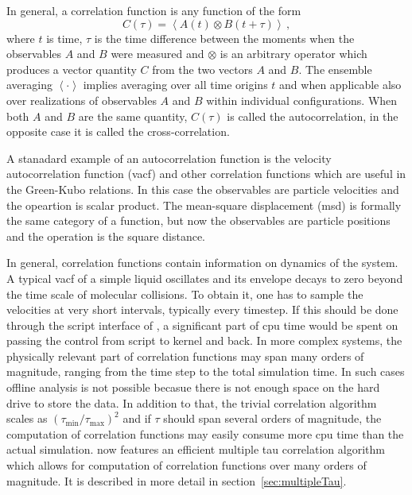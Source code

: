 In general, a correlation function is any function of the form
\begin{equation}
C(\tau) = \left<A\left(t\right) \otimes B\left(t+\tau\right)\right>\,,
\label{eq:CtauDef}
\end{equation}
where $t$ is time, $\tau$ is the time difference between the moments
when the observables $A$ and $B$ were measured and $\otimes$ is an
arbitrary operator which produces a vector quantity 
$C$ from the two vectors $A$ and $B$. The ensemble averaging $\left< \cdot \right>$
implies averaging over all time origins $t$ and when applicable also
over realizations of observables $A$ and $B$ within individual configurations.
When both $A$ and $B$ are
the same quantity, $C(\tau)$ is called the autocorrelation, 
in the opposite case it is called the cross-correlation.

A stanadard example of an autocorrelation function is the velocity
autocorrelation function (vacf) and other correlation functions
which are useful in the Green-Kubo relations. In this case the observables
are particle velocities and the opeartion is scalar product.
The mean-square displacement (msd) is formally the same category of
a function, but now the observables are particle positions and
the operation is the square distance. 

In general, correlation functions
contain information on dynamics of the system. A typical vacf of a 
simple liquid oscillates and its envelope decays to zero beyond the 
time scale of molecular collisions.
To obtain it, one has to sample the velocities at very short intervals,
typically every timestep. If this should be done through the script interface
of \es, a significant part of cpu time would be spent on passing the control
from script to kernel and back. In more complex systems, the physically relevant 
part of correlation functions may span many orders of magnitude, ranging
from the time step to the total simulation time. In such cases offline
analysis is not possible becasue there is not enough space on the hard
drive to store the data. In addition to that, the trivial correlation algorithm
scales as $(\tau_{\mathrm{min}}/\tau_{\mathrm{max}})^2$ and if $\tau$
should span several orders of magnitude, the computation of correlation
functions may easily consume more cpu time than the actual simulation.
\es now features an efficient multiple tau correlation algorithm which
allows for computation of correlation functions over many orders of magnitude.
It is described in more detail in section~\ref{sec:multipleTau}.

